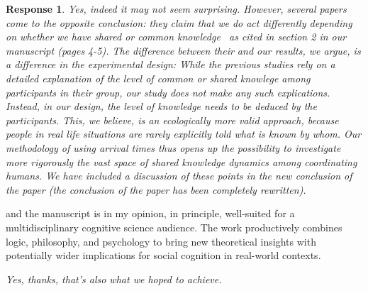 \documentclass[a4paper]{article}
\newtheorem{response}{Response}
\begin{document}
\begin{response}
Yes, indeed it may not seem surprising. However, several papers come to the opposite conclusion: they claim that we \emph{do} act differently depending on whether we have shared or common knowledge~\cite{rubinstein1989electronic, lee2010rationales, thomas2014psychology, thomas2016recursive, thomas2018common, de2019common, de2019maimonides} as cited in section 2 in our manuscript (pages 4-5). The difference between their and our results, we argue, is a difference in the experimental design: While the previous studies rely on a detailed explanation of the level of common or shared knowlege among participants in their group, our study does not make any such explications. Instead, in our design, the level of knowledge needs to be \emph{deduced} by the participants. This, we believe, is an ecologically more valid approach, because people in real life situations are rarely explicitly told what is known by whom. Our methodology of using arrival times thus opens up the possibility to investigate more rigorously the vast space of shared knowledge dynamics among coordinating humans. We have included a discussion of these points in the new conclusion of the paper (the conclusion of the paper has been completely rewritten). 
\end{response} 

 and the manuscript is in my opinion, in principle, well-suited for a multidisciplinary cognitive science audience. The work productively combines logic, philosophy, and psychology to bring new theoretical insights with potentially wider implications for social cognition in real-world contexts.
 
 \medskip
{\noindent \itshape
Yes, thanks, that's also what we hoped to achieve.
}
\end{document}

